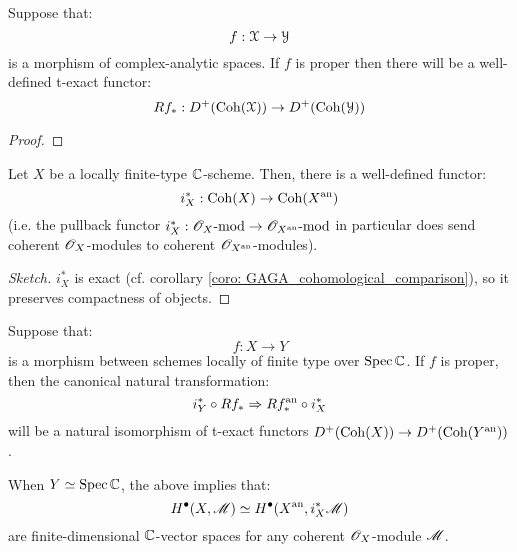             \begin{lemma} \label{lemma: pushforwards_of_analytic_coherent_modules}
                Suppose that:
                    $$f: \mathcal{X} \to \mathcal{Y}$$
                is a morphism of complex-analytic spaces. If $f$ is proper then there will be a well-defined t-exact functor:
                    $$Rf_*: D^+(\mathrm{Coh}(\mathcal{X})) \to D^+(\mathrm{Coh}(\mathcal{Y}))$$
            \end{lemma}
                \begin{proof}
                    
                \end{proof}
            \begin{lemma} \label{lemma: absolute_analytification_of_coherent_modules}
                Let $X$ be a locally finite-type $\mathbb{C}$-scheme. Then, there is a well-defined functor:
                    $$i_X^*: \mathrm{Coh}(X) \to \mathrm{Coh}(X^{\mathrm{an}})$$
                (i.e. the pullback functor $i_X^*: \mathscr{O}_X\text{-}\mathrm{mod} \to \mathscr{O}_{X^{\mathrm{an}}}\text{-}\mathrm{mod}$ in particular does send coherent $\mathscr{O}_X$-modules to coherent $\mathscr{O}_{X^{\mathrm{an}}}$-modules).
            \end{lemma}
                \begin{proof}[Sketch]
                    $i_X^*$ is exact (cf. corollary \ref{coro: GAGA_cohomological_comparison}), so it preserves compactness of objects. 
                \end{proof}
            \begin{theorem} \label{theorem: relative_analytification_of_coherent_modules}
                Suppose that:
                    $$f: X \to Y$$
                is a morphism between schemes locally of finite type over $\operatorname{Spec} \mathbb{C}$. If $f$ is proper, then the canonical natural transformation:
                    $$i_Y^* \circ R f_* \Rightarrow R f^{\mathrm{an}}_* \circ i_X^*$$
                will be a natural isomorphism of t-exact functors $D^+(\mathrm{Coh}(X)) \to D^+(\mathrm{Coh}(Y^{\mathrm{an}}))$.

                When $Y \simeq \operatorname{Spec} \mathbb{C}$, the above implies that:
                    $$H^{\bullet}(X, \mathscr{M}) \simeq H^{\bullet}(X^{\mathrm{an}}, i_X^*\mathscr{M})$$
                are finite-dimensional $\mathbb{C}$-vector spaces for any coherent $\mathscr{O}_X$-module $\mathscr{M}$.
            \end{theorem}
